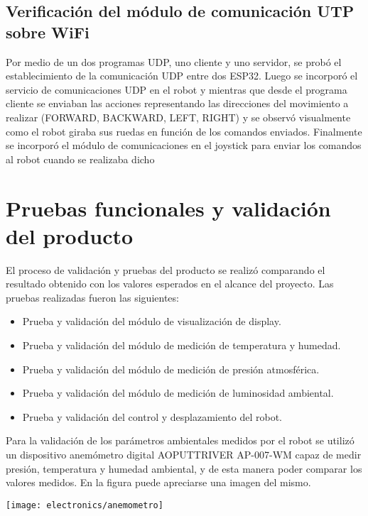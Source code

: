 \subsection{Verificación del módulo de comunicación UTP sobre WiFi}
Por medio de un dos programas UDP, uno cliente y uno servidor, se probó el establecimiento de la comunicación UDP entre dos ESP32. Luego se incorporó el servicio de comunicaciones UDP en el robot y mientras que desde el programa cliente se enviaban las acciones representando las direcciones del movimiento a realizar (FORWARD, BACKWARD, LEFT, RIGHT) y se observó visualmente como el robot giraba sus ruedas en función de los comandos enviados. Finalmente se incorporó el módulo de comunicaciones en el joystick para enviar los comandos al robot cuando se realizaba dicho


\section{Pruebas funcionales y validación del producto}

El proceso de validación y pruebas del producto se realizó comparando el resultado obtenido con los valores esperados en el alcance del proyecto. Las pruebas realizadas fueron las siguientes:
\begin{itemize}
	\item Prueba y validación del módulo de visualización de display.
	\item Prueba y validación del módulo de medición de temperatura y humedad.
	\item Prueba y validación del módulo de medición de presión atmosférica.
	\item Prueba y validación del módulo de medición de luminosidad ambiental.
	\item Prueba y validación del control y desplazamiento del robot.
\end{itemize}

Para la validación de los parámetros ambientales medidos por el robot se utilizó un dispositivo anemómetro digital AOPUTTRIVER AP-007-WM capaz de medir presión, temperatura y humedad ambiental, y de esta manera poder comparar los valores medidos. En la figura puede apreciarse una imagen del mismo.

\begin{center}
\texttt{[image: electronics/anemometro]}
  \label{fig:anemometro}
\end{center}

